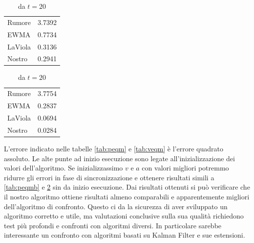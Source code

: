 \begin{table}
    \caption{Velocità: Errore quadrato medio}
    \label{tab:veqm}
    \centering
    \begin{subtable}{.49\textwidth}
        \caption{da $t=0$}
        \centering
        \begin{tabular}{l r}
            Rumore  & 3.7392 \\
            EWMA    & 0.7734 \\
            LaViola & 0.3136 \\
            Nostro  & 0.2941 \\
        \end{tabular}
    \end{subtable}
    \hfill
    \begin{subtable}{.49\textwidth}
        \caption{ da $t=20$ }
        \label{tab:veqmb}
        \centering
        \begin{tabular}{l r}
            Rumore  & 3.7754 \\
            EWMA    & 0.2837 \\
            LaViola & 0.0694 \\
            Nostro  & 0.0284 \\
        \end{tabular}
    \end{subtable}
\end{table}

L'errore indicato nelle tabelle \ref{tab:peqm} e \ref{tab:veqm} è l'errore quadrato assoluto.
Le alte punte ad inizio esecuzione sono legate all'inizializzazione dei valori dell'algoritmo.
Se inizializzassimo $v$ e $a$ con valori migliori potremmo ridurre gli errori in fase di sincronizzazione e ottenere risultati simili a \ref{tab:peqmb} e \ref{tab:veqmb} sin da inizio esecuzione.
Dai risultati ottenuti si può verificare che il nostro algoritmo ottiene risultati almeno comparabili e apparentemente migliori dell'algoritmo di confronto.
Questo ci da la sicurezza di aver sviluppato un algoritmo corretto e utile, ma valutazioni conclusive sulla sua qualità richiedono test più profondi e confronti con algoritmi diversi.
In particolare sarebbe interessante un confronto con algoritmi basati su Kalman Filter e sue estensioni. 
